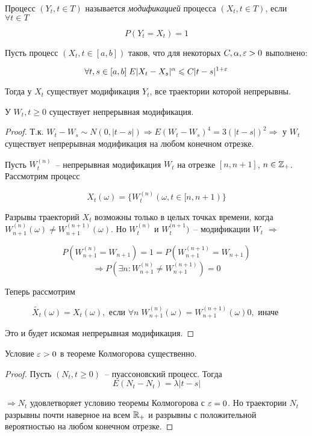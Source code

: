 \begin{definition}
Процесс $(Y_t, t \in T)$ называется \emph{модификацией} процесса $(X_t, t \in T)$, если
$\forall t \in T$

$$P(Y_t = X_t) = 1$$
\end{definition}
\begin{theorem}
Пусть процесс $(X_t, t \in [a,b])$ таков, что для некоторых $C, \alpha, \varepsilon > 0$ выполнено:

$$\forall t, s \in [a,b] \; E|X_t-X_s|^\alpha \leqslant C|t-s|^{1+\varepsilon}$$

Тогда у $X_t$ существует модификация $Y_t$, все траектории которой непрерывны.
\end{theorem}
\begin{corollary}
У $W_t, t \geq 0$ существует непрерывная модификация.
\end{corollary}
\begin{proof}
Т.к. $W_t-W_s \sim N(0, |t-s|) \Rightarrow E(W_t-W_s)^4 = 3(|t-s|)^2 
\Rightarrow$ у $W_t$ существует непрерывная модификация на любом конечном отрезке.

Пусть $W_t^{(n)}$~-- непрерывная модификация $W_t$ на отрезке $[n, n+1]$, $n \in \mathbb{Z}_+$.
Рассмотрим процесс 

$$X_t(\omega) = \{W_t^{(n)}(\omega, t \in [n, n+1)\}$$

Разрывы траекторий $X_t$ возможны только в целых точках времени, когда $W_{n+1}^{(n)}(\omega) \neq
W_{n+1}^{(n+1)}(\omega)$. Но $W_t^{(n)}$ и $W_t^{(n+1})$~-- модификации $W_t$ $\Rightarrow$

$$P(W_{n+1}^{(n)} = W_{n+1}) = 1 = P(W_{n+1}^{(n+1)} = W_{n+1})$$
$$\Rightarrow P(\exists n: W_{n+1}^{(n)} \neq W_{n+1}^{(n+1)}) = 0$$

Теперь рассмотрим 

$$\tilde{X_t}(\omega) = 
X_t(\omega), \text{ если } \forall n \; W_{n+1}^{(n)}(\omega) = W_{n+1}^{(n+1)}(\omega)
0, \text{ иначе }
$$

Это и будет искомая непрерывная модификация.
\end{proof}

\begin{remark}
Условие $\varepsilon > 0$ в теореме Колмогорова существенно.
\end{remark}
\begin{proof}
Пусть $(N_t, t \geq 0)$~-- пуассоновский процесс. Тогда
$$E(N_t-N_t) = \lambda|t-s|$$

$\Rightarrow N_t$ удовлетворяет условию теоремы Колмогорова с $\varepsilon = 0$. Но траектории
$N_t$ разрывны почти наверное на всем $\mathbb{R}_+$ и разрывны с положительной вероятностью на любом конечном отрезке.
\end{proof}


